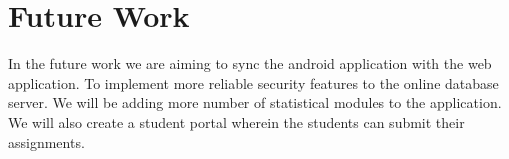 \chapter{Future Work}
In the future work we are aiming to sync the android application with the web application.
To implement more reliable security features to the online database server.
We will be adding more number of statistical modules to the application. We will also create a student portal wherein the students can submit their assignments.